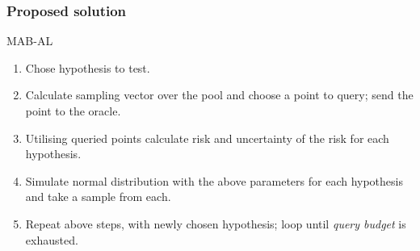\documentclass{beamer}
\begin{document}
  \begin{frame}
  \frametitle{Proposed solution}
    \begin{exampleblock}{MAB-AL}
      \begin{enumerate}
        \item Chose hypothesis to test.
        \item Calculate sampling vector over the pool and choose a point to query; send the point to the oracle.
        \item Utilising queried points calculate risk and uncertainty of the risk for each hypothesis.
        \item Simulate normal distribution with the above parameters for each hypothesis and take a sample from each.
        \item Repeat above steps, with newly chosen hypothesis; loop until \emph{query budget} is exhausted.
      \end{enumerate}
    \end{exampleblock}
  \end{frame}
\end{document}
